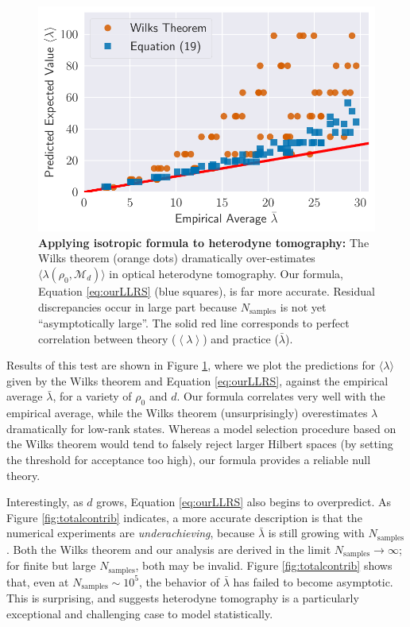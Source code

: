 \documentclass[aps,pra, twocolumn]{revtex4-1}
\newcommand{\M}{\mathcal{M}}
\newcommand{\expect}[1]{\ensuremath{\left\langle#1\right\rangle}}
\begin{document}
\begin{figure}
 \includegraphics[width=.9\columnwidth]{Images/Figure_11.pdf}
 \caption{\textbf{Applying isotropic formula to heterodyne tomography:} The Wilks theorem (orange dots) dramatically over-estimates $\langle\lambda(\rho_{0}, \M_{d})\rangle$ in optical heterodyne tomography. Our formula, Equation \ref{eq:ourLLRS} (blue squares), is far more accurate. Residual discrepancies occur in large part because $N_{\mathrm{samples}}$ is not yet ``asymptotically large''. The solid red line corresponds to perfect correlation between theory ($\expect{\lambda}$) and practice ($\bar\lambda$).}
 \label{fig:modelcomp}
\end{figure}

Results of this test are shown in Figure \ref{fig:modelcomp}, where we plot the predictions for $\langle \lambda \rangle$ given by the Wilks theorem and Equation \eqref{eq:ourLLRS}, against the empirical average $\bar\lambda$, for a variety of $\rho_{0}$ and $d$. Our formula correlates very well with the empirical average, while the Wilks theorem (unsurprisingly) overestimates $\lambda$ dramatically for low-rank states.  Whereas a model selection procedure based on the Wilks theorem would tend to falsely reject larger Hilbert spaces (by setting the threshold for acceptance too high), our formula provides a reliable null theory.



Interestingly, as $d$ grows, Equation \eqref{eq:ourLLRS} also begins to overpredict. As Figure \ref{fig:totalcontrib} indicates, a more accurate description is that the numerical experiments are \emph{underachieving}, because $\bar\lambda$ is still growing with $N_{\mathrm{samples}}$.  Both the Wilks theorem and our analysis are derived in the limit $N_{\mathrm{samples}} \rightarrow \infty$; for finite but large $N_{\mathrm{samples}}$, both may be invalid.  Figure \ref{fig:totalcontrib} shows that, even at $N_{\mathrm{samples}}\sim 10^{5}$, the behavior of $\bar{\lambda}$ has failed to become asymptotic. This is surprising, and suggests heterodyne tomography is a particularly exceptional and challenging case to model statistically. 
\end{document}
